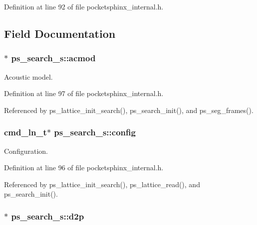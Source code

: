 Definition at line 92 of file pocketsphinx\-\_\-internal.\-h.



\subsection{Field Documentation}
\subsubsection[{acmod}]{$\ast$ ps\-\_\-search\-\_\-s\-::acmod}\label{structps__search__s_a0fdf6fe8c4d9c28f10c48c09517c6b91}


Acoustic model. 



Definition at line 97 of file pocketsphinx\-\_\-internal.\-h.



Referenced by ps\-\_\-lattice\-\_\-init\-\_\-search(), ps\-\_\-search\-\_\-init(), and ps\-\_\-seg\-\_\-frames().

\subsubsection[{config}]{\setlength{\rightskip}{0pt plus 5cm}cmd\-\_\-ln\-\_\-t$\ast$ ps\-\_\-search\-\_\-s\-::config}\label{structps__search__s_aa6e3e18165bbc70084a06575d5703042}


Configuration. 



Definition at line 96 of file pocketsphinx\-\_\-internal.\-h.



Referenced by ps\-\_\-lattice\-\_\-init\-\_\-search(), ps\-\_\-lattice\-\_\-read(), and ps\-\_\-search\-\_\-init().

\subsubsection[{d2p}]{$\ast$ ps\-\_\-search\-\_\-s\-::d2p}\label{structps__search__s_a81b461e7ef3a080d046039e186134a15}


